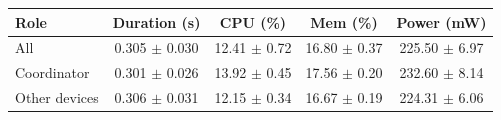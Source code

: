 \begin{tabular}{lcccc}
\hline
\textbf{Role} & \textbf{Duration (s)} & \textbf{CPU (\%)} & \textbf{Mem (\%)} & \textbf{Power (mW)} \\
\hline
All & 0.305 $\pm$ 0.030 & 12.41 $\pm$ 0.72 & 16.80 $\pm$ 0.37 & 225.50 $\pm$ 6.97 \\
Coordinator & 0.301 $\pm$ 0.026 & 13.92 $\pm$ 0.45 & 17.56 $\pm$ 0.20 & 232.60 $\pm$ 8.14 \\
Other devices & 0.306 $\pm$ 0.031 & 12.15 $\pm$ 0.34 & 16.67 $\pm$ 0.19 & 224.31 $\pm$ 6.06 \\
\hline
\end{tabular}
